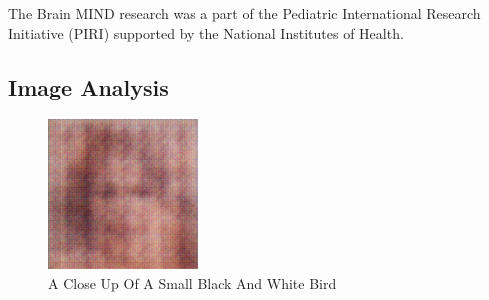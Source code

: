 \documentclass{article}%
\begin{document}
The Brain MIND research was a part of the Pediatric International Research Initiative (PIRI) supported by the National Institutes of Health.

%
\subsection{Image Analysis}%
\label{subsec:ImageAnalysis}%


\begin{figure}[h!]%
\centering%
\includegraphics[width=150px]{500_fake_images/samples_5_423.png}%
\caption{A Close Up Of A Small Black And White Bird}%
\end{figure}

%
\end{document}
